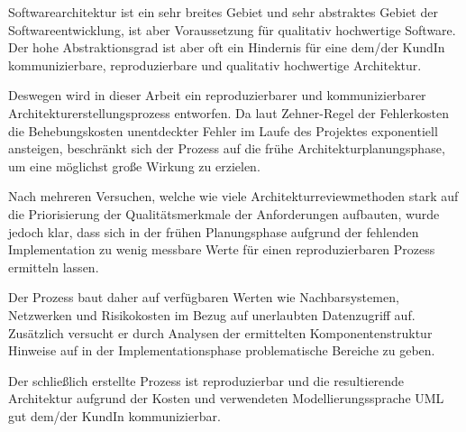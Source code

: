 Softwarearchitektur ist ein sehr breites Gebiet und sehr abstraktes Gebiet der Softwareentwicklung, ist aber Voraussetzung für qualitativ hochwertige Software. Der hohe Abstraktionsgrad ist aber oft ein Hindernis für eine dem/der KundIn kommunizierbare, reproduzierbare und qualitativ hochwertige Architektur.

Deswegen wird in dieser Arbeit ein reproduzierbarer und kommunizierbarer Architekturerstellungsprozess entworfen. Da laut Zehner-Regel der Fehlerkosten die Behebungskosten unentdeckter Fehler im Laufe des Projektes exponentiell ansteigen, beschränkt sich der Prozess auf die frühe Architekturplanungsphase, um eine möglichst große Wirkung zu erzielen.

Nach mehreren Versuchen, welche wie viele Architekturreviewmethoden stark auf die Priorisierung der Qualitätsmerkmale der Anforderungen aufbauten, wurde jedoch klar, dass sich in der frühen Planungsphase aufgrund der fehlenden Implementation zu wenig messbare Werte für einen reproduzierbaren Prozess ermitteln lassen.

Der Prozess baut daher auf verfügbaren Werten wie Nachbarsystemen, Netzwerken und Risikokosten im Bezug auf unerlaubten Datenzugriff auf. Zusätzlich versucht er durch Analysen der ermittelten Komponentenstruktur Hinweise auf in der Implementationsphase problematische Bereiche zu geben.

Der schließlich erstellte Prozess ist reproduzierbar und die resultierende Architektur aufgrund der Kosten und verwendeten Modellierungssprache UML gut dem/der KundIn kommunizierbar.